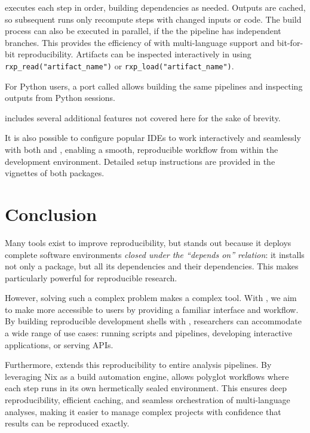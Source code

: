 \documentclass[
  article]{jss}
\begin{document}
 executes each step in order, building dependencies as needed.
Outputs are cached, so subsequent runs only recompute steps with changed
inputs or code. The build process can also be executed in parallel, if
the the pipeline has independent branches. This provides the efficiency
of  with multi-language support and bit-for-bit
reproducibility. Artifacts can be inspected interactively in
 using \texttt{rxp\_read("artifact\_name")} or
\texttt{rxp\_load("artifact\_name")}.

For Python users, a port called  allows building the same
pipelines and inspecting outputs from Python sessions.

 includes several additional features not covered here for
the sake of brevity.

It is also possible to configure popular IDEs to work interactively and
seamlessly with both  and , enabling a smooth,
reproducible workflow from within the development environment. Detailed
setup instructions are provided in the vignettes of both packages.

\section{Conclusion}\label{sec-conclusion}

Many tools exist to improve reproducibility, but  stands out
because it deploys complete software environments \emph{closed under the
``depends on'' relation}: it installs not only a package, but all its
dependencies and their dependencies. This makes  particularly
powerful for reproducible research.

However, solving such a complex problem makes  a complex tool.
With , we aim to make  more accessible to 
users by providing a familiar interface and workflow. By building
reproducible development shells with , researchers can
accommodate a wide range of use cases: running scripts and pipelines,
developing interactive  applications, or serving
 APIs.

Furthermore,  extends this reproducibility to entire
analysis pipelines. By leveraging Nix as a build automation engine,
 allows polyglot workflows where each step runs in its own
hermetically sealed environment. This ensures deep reproducibility,
efficient caching, and seamless orchestration of multi-language
analyses, making it easier to manage complex projects with confidence
that results can be reproduced exactly.
\end{document}
